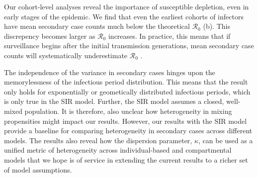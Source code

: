 Our cohort-level analyses reveal the importance of susceptible depletion, even in early stages of the epidemic. We find that even the earliest cohorts of infectors have mean secondary case counts much below the theoretical $\mathcal{R}_0$ (b). This discrepency becomes larger as $\mathcal{R}_0$ increases. In practice, this means that if surveillance begins after the initial transmission generations, mean secondary case counts will systematically underestimate $\mathcal{R}_0$ \cite{pellis2022estimation}.
 
The independence of the variance in secondary cases hinges upon the memorylessness of the infectious period distribution. This means that the result only holds for exponentially or geometically distributed infectious periods, which is only true in the SIR model. Further, the SIR model assumes a closed, well-mixed population. It is therefore, also unclear how heterogeneity in mixing propensities might impact our results. However, our results with the SIR model provide a baseline for comparing heterogeneity in secondary cases across different models. The results also reveal how the dispersion parameter, $\kappa$, can be used as a unified metric of heterogeneity across individual-based and compartmental models that we hope is of service in extending the current results to a richer set of model assumptions. 

